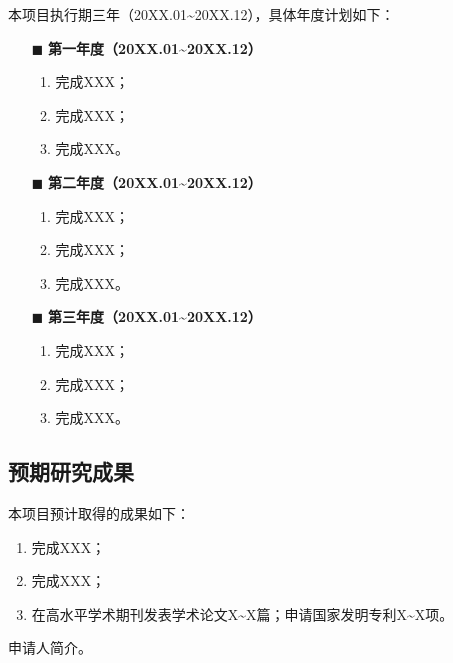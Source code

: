 \documentclass[UTF8,12pt,AutoFakeBold=2]{ctexart}
\begin{document}
本项目执行期三年（20XX.01\textasciitilde 20XX.12），具体年度计划如下：
\begin{sloppypar}
	\begin{itemize}[itemindent=6.5pt]
		\item[$\blacksquare$] \textbf{第一年度（20XX.01\textasciitilde 20XX.12）}
			\begin{enumerate}[label=\arabic*)]
				\item 完成XXX；
				\item 完成XXX；
				\item 完成XXX。
			\end{enumerate}
		\item[$\blacksquare$] \textbf{第二年度（20XX.01\textasciitilde 20XX.12）}
			\begin{enumerate}[label=\arabic*)]
				\item 完成XXX；
				\item 完成XXX；
				\item 完成XXX。
			\end{enumerate}
		\item[$\blacksquare$] \textbf{第三年度（20XX.01\textasciitilde 20XX.12）}
			\begin{enumerate}[label=\arabic*)]
				\item 完成XXX；
				\item 完成XXX；
				\item 完成XXX。
			\end{enumerate}	
	\end{itemize}
\end{sloppypar}


\subsection{预期研究成果}
本项目预计取得的成果如下：
\begin{enumerate}[label=\arabic*)]
	\item 完成XXX；
	\item 完成XXX；
	\item 在高水平学术期刊发表学术论文X\textasciitilde X篇；申请国家发明专利X\textasciitilde X项。
\end{enumerate}



申请人简介。
\end{document}
